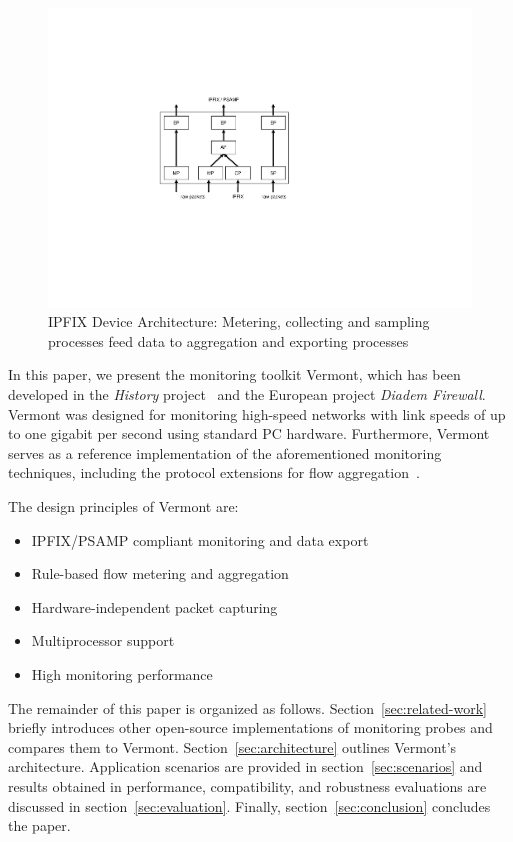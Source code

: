 \begin{figure}
\begin{center}
\includegraphics[scale=0.65]{gfx/ipfix-arch3.pdf}
\caption{IPFIX Device Architecture: Metering, collecting and sampling processes feed data to aggregation and exporting processes}
\label{fig_ipfix_arch}
\end{center}
\end{figure}


In this paper, we present the monitoring toolkit Vermont, which has been developed in the \emph{History} project~\cite{dressler2005history} and the European project \emph{Diadem Firewall}.
Vermont was designed for monitoring high-speed networks with link speeds of up to one gigabit per second using standard PC hardware.
Furthermore, Vermont serves as a reference implementation of the aforementioned monitoring techniques, including the protocol extensions for flow aggregation~\cite{dressler-ipfix-aggregation}.

The design principles of Vermont are:
\begin{itemize}
\item IPFIX/PSAMP compliant monitoring and data export
\item Rule-based flow metering and aggregation
\item Hardware-independent packet capturing
\item Multiprocessor support
\item High monitoring performance
\end{itemize}

The remainder of this paper is organized as follows.
Section~\ref{sec:related-work} briefly introduces other open-source implementations of monitoring probes and compares them to Vermont.
Section~\ref{sec:architecture} outlines Vermont's architecture.
Application scenarios are provided in section~\ref{sec:scenarios} and results obtained in performance, compatibility, and robustness evaluations are discussed in section~\ref{sec:evaluation}.
Finally, section~\ref{sec:conclusion} concludes the paper.
